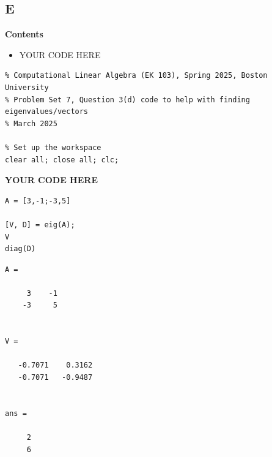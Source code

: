 \documentclass{article}
\begin{document}
\subsection*{E}

\textbf{Contents}

\begin{itemize}
	\setlength{\itemsep}{-1ex}
	\item YOUR CODE HERE
\end{itemize}
\begin{verbatim}
% Computational Linear Algebra (EK 103), Spring 2025, Boston University
% Problem Set 7, Question 3(d) code to help with finding eigenvalues/vectors
% March 2025

% Set up the workspace
clear all; close all; clc;
\end{verbatim}


\textbf{YOUR CODE HERE}

\begin{verbatim}
A = [3,-1;-3,5]

[V, D] = eig(A);
V
diag(D)
\end{verbatim}

\color{lightgray} \begin{verbatim}
A =

     3    -1
    -3     5


V =

   -0.7071    0.3162
   -0.7071   -0.9487


ans =

     2
     6

\end{verbatim} \color{black}
\end{document}

